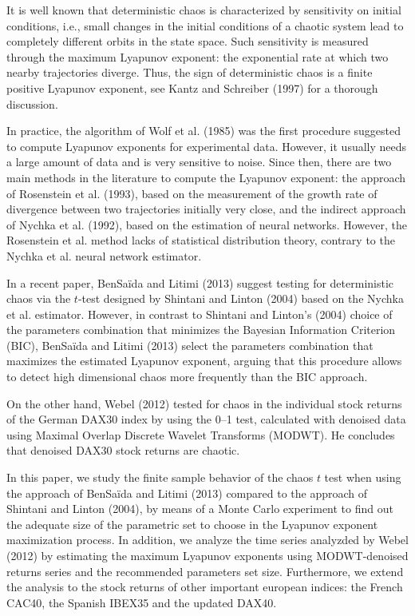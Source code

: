 \documentclass[12pt]{article}
\begin{document}
It is well known that deterministic chaos is characterized by sensitivity on initial conditions, i.e., small changes in the initial conditions of a chaotic system lead to completely different orbits in the state space.
Such sensitivity is measured through the maximum Lyapunov exponent: the exponential rate at which two nearby trajectories diverge. Thus, the sign of deterministic chaos is a finite positive Lyapunov exponent, see Kantz and Schreiber (1997) for a thorough discussion.


In practice, the algorithm of Wolf et al. (1985) was the first procedure suggested to compute Lyapunov exponents for experimental data. However, it usually needs a large amount of data and is very sensitive to noise. Since then, there are two main methods in the literature to compute the Lyapunov exponent: the approach of Rosenstein et al. (1993), based on the measurement of the growth rate of divergence between two trajectories initially very close, and the indirect approach of Nychka et al. (1992), based on the estimation of neural networks. However, the Rosenstein et al. method lacks of statistical distribution theory, contrary to the Nychka et al. neural network estimator.

In a recent paper, BenSa\"{i}da and Litimi (2013) suggest testing for deterministic chaos via the $t$-test designed by Shintani and Linton (2004) based on the Nychka et al. estimator. However, in contrast to Shintani and Linton's (2004) choice of the parameters combination that minimizes the Bayesian Information Criterion (BIC), BenSa\"{i}da and Litimi (2013) select the parameters combination that maximizes the estimated Lyapunov exponent, arguing that this procedure allows to detect high dimensional chaos more frequently than the BIC approach.

On the other hand, Webel (2012) tested for chaos in the individual stock returns of the German DAX30 index by using the 0--1 test, calculated with denoised data using Maximal Overlap Discrete Wavelet Transforms (MODWT). He concludes that denoised DAX30 stock returns are chaotic.

In this paper, we study the finite sample behavior of the chaos $t$ test when using the approach of
BenSa\"{i}da and Litimi (2013) compared to the approach of Shintani and Linton (2004), by means of a Monte Carlo experiment to find out the adequate size of the parametric set to choose in the Lyapunov exponent maximization process. In addition, we analyze the time series analyzded by Webel (2012) by estimating the maximum Lyapunov exponents using MODWT-denoised returns series and the recommended parameters set size. Furthermore, we extend the analysis to the stock returns of other important european indices: the French CAC40, the Spanish IBEX35 and the updated DAX40.
\end{document}
